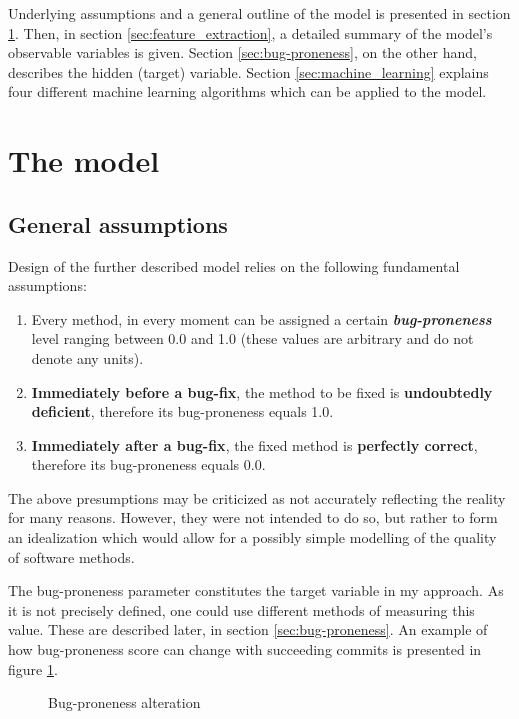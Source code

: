 \documentclass{pracamgr}
\begin{document}
Underlying assumptions and a general outline of the model is presented in section \ref{sec:model}. Then, in section \ref{sec:feature_extraction}, a detailed summary of the model's observable variables is given. Section \ref{sec:bug-proneness}, on the other hand, describes the hidden (target) variable. Section \ref{sec:machine_learning} explains four different machine learning algorithms which can be applied to the model.

\section{The model}
\label{sec:model}

\subsection{General assumptions}
\label{sec:general_assumptions}
Design of the further described model relies on the following fundamental assumptions:
\begin{enumerate}[label=(A\arabic*)]
	\item Every method, in every moment can be assigned a certain \textbf{\emph{bug-proneness}} level ranging between 0.0 and 1.0 (these values are arbitrary and do not denote any units).
	\item \textbf{Immediately before a bug-fix}, the method to be fixed is \textbf{undoubtedly deficient}, therefore its bug-proneness equals 1.0.
	\item \textbf{Immediately after a bug-fix}, the fixed method is \textbf{perfectly correct}, therefore its bug-proneness equals 0.0. 
\end{enumerate}
The above presumptions may be criticized as not accurately reflecting the reality for many reasons. However, they were not intended to do so, but rather to form an idealization which would allow for a possibly simple modelling of the quality of software methods.

The bug-proneness parameter constitutes the target variable in my approach. As it is not precisely defined, one could use different methods of measuring this value. These are described later, in section \ref{sec:bug-proneness}. An example of how bug-proneness score can change with succeeding commits is presented in figure \ref{fig:bug_proneness}.

\begin{figure}[h]
\centering

\caption{Bug-proneness alteration}
\label{fig:bug_proneness}
\end{figure}
\end{document}
